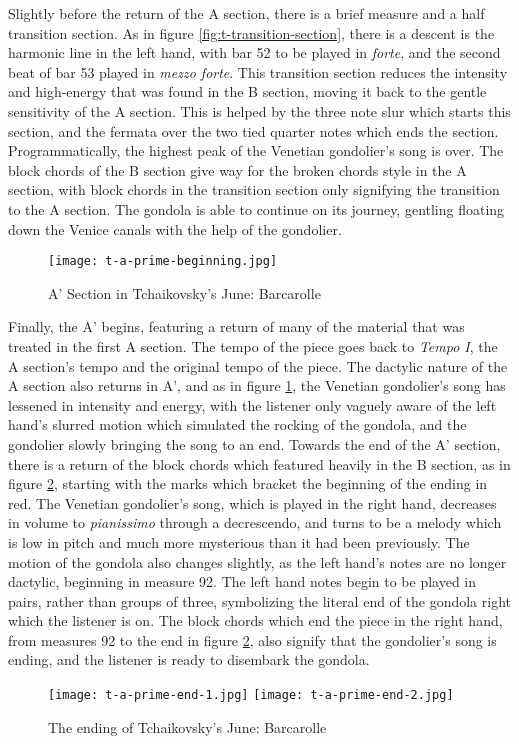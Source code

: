 Slightly before the return of the A section, there is a brief measure and a half transition section. As in figure \ref{fig:t-transition-section}\autocite{Henle_2002}, there is a descent is the harmonic line in the left hand, with bar 52 to be played in \textit{forte}, and the second beat of bar 53 played in \textit{mezzo forte}. This transition section reduces the intensity and high-energy that was found in the B section, moving it back to the gentle sensitivity of the A section. This is helped by the three note slur which starts this section, and the fermata over the two tied quarter notes which ends the section. Programmatically, the highest peak of the Venetian gondolier's song is over. The block chords of the B section give way for the broken chords style in the A section, with block chords in the transition section only signifying the transition to the A section. The gondola is able to continue on its journey, gentling floating down the Venice canals with the help of the gondolier.

\begin{figure}
  \centering
  \texttt{[image: t-a-prime-beginning.jpg]}
  \caption{A' Section in Tchaikovsky's June: Barcarolle}
  \label{fig:t-a-prime-beginning}
\end{figure}


Finally, the A' begins, featuring a return of many of the material that was treated in the first A section. The tempo of the piece goes back to \textit{Tempo I}, the A section's tempo and the original tempo of the piece. The dactylic nature of the A section also returns in A', and as in figure \ref{fig:t-a-prime-beginning}\autocite{Henle_2002}, the Venetian gondolier's song has lessened in intensity and energy, with the listener only vaguely aware of the left hand's slurred motion which simulated the rocking of the gondola, and the gondolier slowly bringing the song to an end. Towards the end of the A' section, there is a return of the block chords which featured heavily in the B section, as in figure \ref{fig:t-a-prime-ending}\autocite{Henle_2002}, starting with the marks which bracket the beginning of the ending in red. The Venetian gondolier's song, which is played in the right hand, decreases in volume to \textit{pianissimo} through a decrescendo, and turns to be a melody which is low in pitch and much more mysterious than it had been previously. The motion of the gondola also changes slightly, as the left hand's notes are no longer dactylic, beginning in measure 92. The left hand notes begin to be played in pairs, rather than groups of three, symbolizing the literal end of the gondola right which the listener is on. The block chords which end the piece in the right hand, from measures 92 to the end in figure \ref{fig:t-a-prime-ending}\autocite{Henle_2002}, also signify that the gondolier's song is ending, and the listener is ready to disembark the gondola.

\begin{figure}
  \centering
  \texttt{[image: t-a-prime-end-1.jpg]}
  \texttt{[image: t-a-prime-end-2.jpg]}
  \caption{The ending of Tchaikovsky's June: Barcarolle}
  \label{fig:t-a-prime-ending}
\end{figure}
